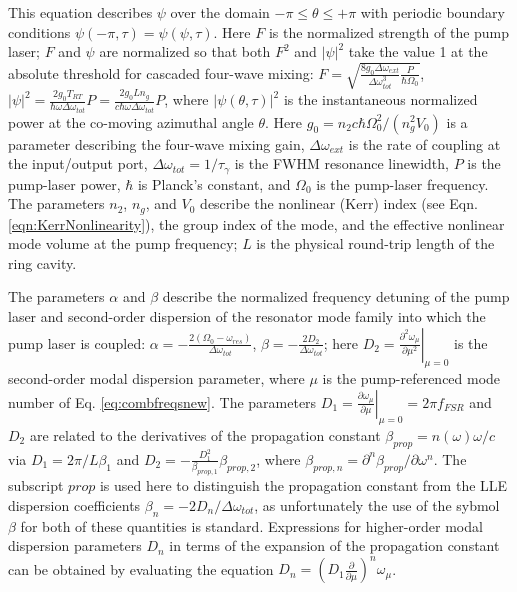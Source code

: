 This equation describes $\psi$ over the domain $-\pi\leq\theta\leq+\pi$ with periodic boundary conditions $\psi(-\pi,\tau)=\psi(\psi,\tau)$. Here $F$ is the normalized strength of the pump laser; $F$ and $\psi$ are normalized so that both $F^2$ and $|\psi|^2$ take the value 1 at the absolute threshold for cascaded four-wave mixing: $F=\sqrt{\frac{8 g_0\Delta\omega_{ext}}{\Delta\omega_{tot}^3}\frac{P}{\hbar \Omega_0}}$, $|\psi|^2=\frac{2g_0T_{RT}}{\hbar\omega\Delta\omega_{tot}}P=\frac{2g_0Ln_g}{c\hbar\omega\Delta\omega_{tot}}P$, where $|\psi(\theta,\tau)|^2$ is the instantaneous normalized power at the co-moving azimuthal angle $\theta$. Here $g_0=n_2 c \hbar \Omega_0^2/(n_g^2 V_0)$ is a parameter describing the four-wave mixing gain, $\Delta\omega_{ext}$ is the rate of coupling at the input/output port, $\Delta\omega_{tot}=1/\tau_\gamma$ is the FWHM resonance linewidth, $P$ is the pump-laser power, $\hbar$ is Planck's constant, and $\Omega_0$ is the pump-laser frequency. The parameters $n_2$, $n_g$, and $V_0$ describe the nonlinear (Kerr) index (see Eqn. \ref{eqn:KerrNonlinearity}), the group index of the mode, and the effective nonlinear mode volume at the pump frequency; $L$ is the physical round-trip length of the ring cavity. 

The parameters $\alpha$ and $\beta$ describe the normalized frequency detuning of the pump laser and second-order dispersion of the resonator mode family into which the pump laser is coupled: $\alpha=-\frac{2(\Omega_0-\omega_{res})}{\Delta\omega_{tot}}$, $\beta=-\frac{2 D_2}{\Delta\omega_{tot}}$; here $D_2=\left.\frac{\partial^2\omega_\mu}{\partial \mu^2}\right|_{\mu=0}$ is the second-order modal dispersion parameter, where $\mu$ is the pump-referenced mode number of Eq. \ref{eq:combfreqsnew}. The parameters $D_1=\left.\frac{\partial\omega_\mu}{\partial\mu}\right|_{\mu=0}=2\pi f_{FSR}$ and $D_2$ are related to the derivatives of the propagation constant $\beta_{prop}=n(\omega)\omega/c$ via $D_1=2\pi/L\beta_1$ and $D_2=-\frac{D_1^2}{\beta_{prop,1}}\beta_{prop,2}$, where $\beta_{prop,n}=\partial^n\beta_{prop}/\partial\omega^n$. The subscript $prop$ is used here to distinguish the propagation constant from the LLE dispersion coefficients $\beta_n=-2D_n/\Delta\omega_{tot}$, as unfortunately the use of the sybmol $\beta$ for both of these quantities is standard. Expressions for higher-order modal dispersion parameters $D_n$ in terms of the expansion of the propagation constant can be obtained by evaluating the equation $D_n=(D_1\frac{\partial}{\partial \mu})^n \omega_\mu$.


